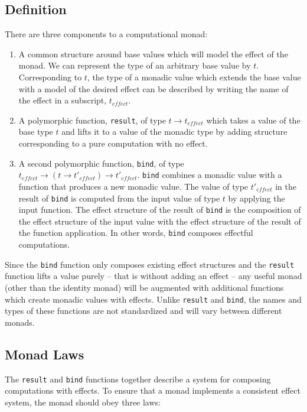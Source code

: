 \documentclass[natbib,10pt]{sigplanconf}
\begin{document}
\subsection{Definition}

There are three components to a computational monad:
\begin{enumerate}
\item
A common structure around base values which will model the
effect of the monad.  We can represent the type of an arbitrary
base value by $t$. Corresponding to $t$, the type of a monadic
value which extends the base value with a model of the desired
effect can be described by writing the name of the effect
in a subscript, $t_{effect}$.

\item
A polymorphic function, \texttt{result}, of type $t \rightarrow t_{effect}$
which takes a value of the base type $t$ and lifts it to a value of the
monadic type by adding structure corresponding to a pure computation
with no effect.

\item
A second polymorphic function, \texttt{bind}, of type
$t_{effect} \rightarrow (t \rightarrow t'_{effect}) \rightarrow t'_{effect}$.
\texttt{bind} combines a monadic value with a function that produces a new
monadic value. The value of type $t'_{effect}$ in the result of \texttt{bind}
is computed from the input value of type $t$ by applying the input function.
The effect structure of the result of \texttt{bind} is the composition of
the effect structure of the input value with the effect structure of the
result of the function application. In other words, \texttt{bind} composes
effectful computations.
\end{enumerate}

Since the \texttt{bind} function only composes existing effect structures
and the \texttt{result} function lifts a value purely -- that is without
adding an effect -- any useful monad (other than the identity monad)
will be augmented with additional functions which create monadic
values with effects.  Unlike \texttt{result} and \texttt{bind}, the names
and types of these functions are not standardized and will vary
between different monads.

\subsection{Monad Laws}

The \texttt{result} and \texttt{bind} functions together describe a system
for composing computations with effects.  To ensure that a monad
implements a consistent effect system, the monad should obey three laws:
\end{document}
